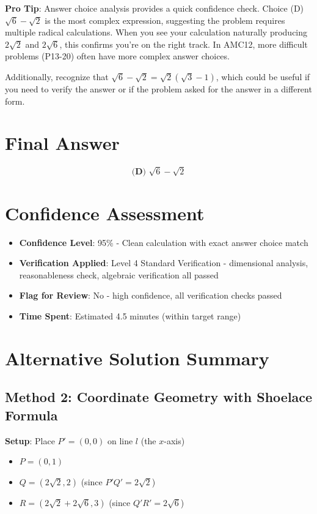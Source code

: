 \documentclass[]{article}
\begin{document}
\begin{tipbox}
\textbf{Pro Tip}: Answer choice analysis provides a quick confidence check. Choice (D) $\sqrt{6} - \sqrt{2}$ is the most complex expression, suggesting the problem requires multiple radical calculations. When you see your calculation naturally producing $2\sqrt{2}$ and $2\sqrt{6}$, this confirms you're on the right track. In AMC12, more difficult problems (P13-20) often have more complex answer choices.

Additionally, recognize that $\sqrt{6} - \sqrt{2} = \sqrt{2}(\sqrt{3} - 1)$, which could be useful if you need to verify the answer or if the problem asked for the answer in a different form.
\end{tipbox}

\section*{Final Answer}
\[\boxed{\textbf{(D) } \sqrt{6}-\sqrt{2}}\]

\section*{Confidence Assessment}
\begin{itemize}[leftmargin=*]
    \item \textbf{Confidence Level}: 95\% - Clean calculation with exact answer choice match
    \item \textbf{Verification Applied}: Level 4 Standard Verification - dimensional analysis, reasonableness check, algebraic verification all passed
    \item \textbf{Flag for Review}: No - high confidence, all verification checks passed
    \item \textbf{Time Spent}: Estimated 4.5 minutes (within target range)
\end{itemize}

\section*{Alternative Solution Summary}

\subsection*{Method 2: Coordinate Geometry with Shoelace Formula}

\textbf{Setup}: Place $P' = (0,0)$ on line $l$ (the $x$-axis)
\begin{itemize}
    \item $P = (0, 1)$
    \item $Q = (2\sqrt{2}, 2)$ (since $P'Q' = 2\sqrt{2}$)
    \item $R = (2\sqrt{2} + 2\sqrt{6}, 3)$ (since $Q'R' = 2\sqrt{6}$)
\end{itemize}
\end{document}
